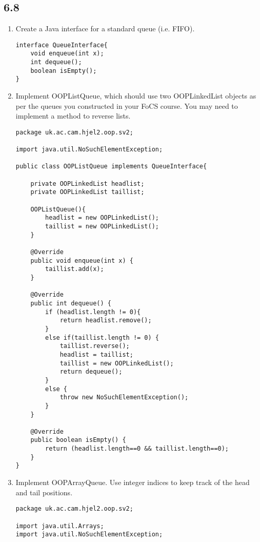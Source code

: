 \documentclass[10pt,\jkfside,a4paper]{article}
\begin{document}
\subsection*{6.8}
\begin{enumerate}

\item Create a Java interface for a standard queue (i.e. FIFO).

\begin{verbatim}
interface QueueInterface{
    void enqueue(int x);
    int dequeue();
    boolean isEmpty();
}
\end{verbatim}

\item Implement OOPListQueue, which should use two OOPLinkedList objects as per 
the queues you constructed in your FoCS course. You may need to implement a method 
to reverse lists.

\begin{verbatim}
package uk.ac.cam.hjel2.oop.sv2;

import java.util.NoSuchElementException;

public class OOPListQueue implements QueueInterface{

    private OOPLinkedList headlist;
    private OOPLinkedList taillist;

    OOPListQueue(){
        headlist = new OOPLinkedList();
        taillist = new OOPLinkedList();
    }

    @Override
    public void enqueue(int x) {
        taillist.add(x);
    }

    @Override
    public int dequeue() {
        if (headlist.length != 0){
            return headlist.remove();
        }
        else if(taillist.length != 0) {
            taillist.reverse();
            headlist = taillist;
            taillist = new OOPLinkedList();
            return dequeue();
        }
        else {
            throw new NoSuchElementException();
        }
    }

    @Override
    public boolean isEmpty() {
        return (headlist.length==0 && taillist.length==0);
    }
}
\end{verbatim}

\item Implement OOPArrayQueue. Use integer indices to keep track of the head and tail positions.

\begin{verbatim}
package uk.ac.cam.hjel2.oop.sv2;

import java.util.Arrays;
import java.util.NoSuchElementException;


\end{verbatim}
\end{enumerate}
\end{document}

